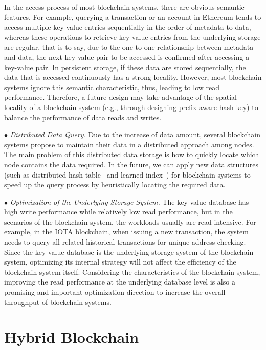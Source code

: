 \documentclass[acmsmall]{acmart}
\begin{document}
In the access process of most blockchain systems, there are obvious semantic features. For example, querying a transaction or an account in Ethereum tends to access multiple key-value entries sequentially in the order of metadata to data, whereas these operations to retrieve key-value entries from the underlying storage are regular, that is to say, due to the one-to-one relationship between metadata and data, the next key-value pair to be accessed is confirmed after accessing a key-value pair. In persistent storage, if these data are stored sequentially, the data that is accessed continuously has a strong locality. However, most blockchain systems ignore this semantic characteristic, thus, leading to low read performance. Therefore, a future design may take advantage of the spatial locality of a blockchain system (e.g., through designing prefix-aware hash key) to balance the performance of data reads and writes.


$\bullet$ {\it Distributed Data Query.} 
Due to the increase of data amount, several blockchain systems propose to maintain their data in a distributed approach among nodes. The main problem of this distributed data storage is how to quickly locate which node contains the data required. In the future, we can apply new data structures (such as distributed hash table~\cite{maurer1975hash} and learned index~\cite{soloman2005index}) for blockchain systems to speed up the query process by heuristically locating the required data. 


$\bullet$ {\it Optimization of the Underlying Storage System.} 
The key-value database has high write performance while relatively low read performance, but in the scenarios of the blockchain system, the workloads usually are read-intensive. For example, in the IOTA blockchain, when issuing a new transaction, the system needs to query all related historical transactions for unique address checking. Since the key-value database is the underlying storage system of the blockchain system, optimizing its internal strategy will not affect the efficiency of the blockchain system itself. Considering the characteristics of the blockchain system, improving the read performance at the underlying database level is also a promising and important optimization direction to increase the overall throughput of blockchain systems.


\section{Hybrid Blockchain}
\label{sec:hybrid}
\end{document}
